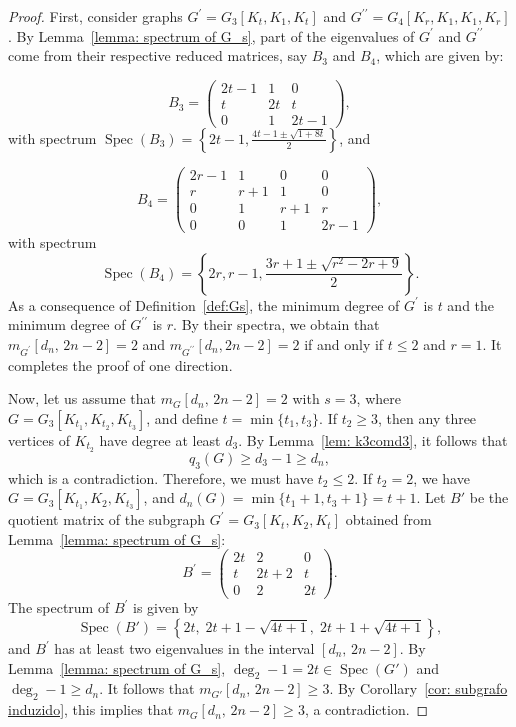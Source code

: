 \documentclass[preprint,12pt]{elsarticle}
\begin{document}
\begin{proof} 
First, consider graphs $G^{\prime} = G_3[K_{t}, K_{1}, K_{t}]$ and $G^{\prime \prime} = G_4[K_{r}, K_{1}, K_{1}, K_{r}]$. By Lemma~\ref{lemma: spectrum of G_s}, part of the eigenvalues of $G^{\prime}$ and $G^{\prime \prime}$ come from their respective reduced matrices, say $B_3$ and $B_4$, which are given by:

\[
B_3 = \begin{pmatrix}
2t - 1 & 1 & 0 \\
t & 2t & t \\
0 & 1 & 2t - 1
\end{pmatrix},
\]
with spectrum $\operatorname{Spec}(B_3) = \left\{2t-1, \frac{4t - 1 \pm \sqrt{1 +8t}}{2}\right\}$, and 

\[
B_4 = \begin{pmatrix}
2r-1 & 1 & 0 & 0 \\
r & r+1 & 1 & 0 \\
0 & 1 & r+1 & r \\
0 & 0 & 1 & 2r-1
\end{pmatrix},
\]
with spectrum 
\begin{equation}\label{eq:B4}
\operatorname{Spec}(B_4) = \left\{2r, r-1, \frac{3r + 1 \pm \sqrt{r^2-2r +9}}{2}\right\}.
\end{equation}
As a consequence of Definition~\ref{def:Gs}, the minimum degree of $G^{\prime}$ is $t$ and the minimum degree of $G^{\prime \prime}$ is $r$. By their spectra, we obtain that $m_{G^{\prime}}[d_n,\, 2n - 2] = 2$ and $m_{G^{\prime \prime}} [d_n, 2n - 2] = 2$ if and only if $t \leq 2$ and $r = 1$. It completes the proof of one direction.

Now, let us assume that $m_G[d_n,\, 2n-2] = 2$ with $s = 3$, where $G = G_3[K_{t_1}, K_{t_2}, K_{t_3}]$, and define $t = \min\{t_1, t_3\}$.  If $t_2 \geq 3$, then any three vertices of $K_{t_2}$ have degree at least $d_3$. 
By Lemma~\ref{lem: k3comd3}, it follows that
\[
q_3(G) \geq d_3 - 1 \geq d_n,
\]
which is a contradiction. Therefore, we must have $t_2 \leq 2$. If $t_2 = 2$, we have $G = G_3[K_{t_1}, K_{2}, K_{t_3}]$, and $d_n(G) = \min\{t_1+1, t_3+1\}=t+1.$ Let $B'$ be the quotient matrix of the subgraph $G^{\prime} = G_3[K_t, K_2, K_t]$ obtained from Lemma~\ref{lemma: spectrum of G_s}:
\[
B^{\prime} =
\begin{pmatrix}
2t & 2 & 0 \\
t & 2t + 2 & t \\
0 & 2 & 2t
\end{pmatrix}.
\]
The spectrum of $B^{\prime}$ is given by 
%
\[
\operatorname{Spec}(B')
=
\left\{
2t,\;
2t + 1 - \sqrt{4t + 1},\;
2t + 1 + \sqrt{4t + 1}
\right\},
\]
and $B^{\prime}$ has at least two eigenvalues in the interval $[d_n,\, 2n-2]$. 
 By Lemma~\ref{lemma: spectrum of G_s}, $\deg_{2} - 1 = 2t \in \operatorname{Spec}(G')$ and $\deg_{2} - 1 \ge d_n$. It follows that $m_{G'}[d_n,\, 2n-2] \ge 3.$ By Corollary~\ref{cor: subgrafo induzido}, this implies that $m_{G}[d_n,\, 2n-2] \ge 3$, a contradiction.


\end{proof}
\end{document}
